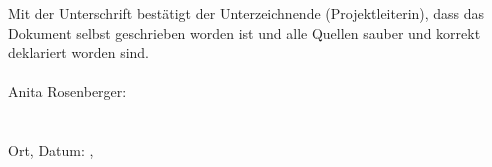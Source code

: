 Mit der Unterschrift bestätigt der Unterzeichnende (Projektleiterin), dass das Dokument selbst geschrieben worden ist und alle Quellen sauber und korrekt deklariert worden sind.
\\
\\

Anita Rosenberger:  \underline{\hspace{8cm}}
\\
\\
\\
Ort, Datum:  \underline{\hspace{5cm}},  \underline{\hspace{4cm}}
